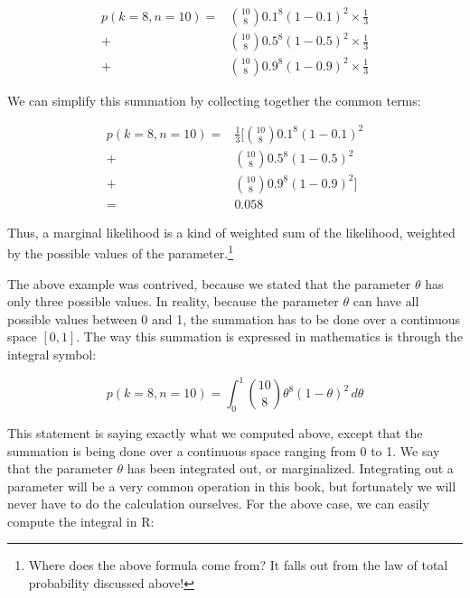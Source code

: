 \documentclass[12pt,]{krantz}
\newenvironment{Shaded}{\begin{snugshade}}{\end{snugshade}}
\newcommand{\ControlFlowTok}[1]{\textcolor[rgb]{0.13,0.29,0.53}{\textbf{#1}}}
\newcommand{\DataTypeTok}[1]{\textcolor[rgb]{0.13,0.29,0.53}{#1}}
\newcommand{\DecValTok}[1]{\textcolor[rgb]{0.00,0.00,0.81}{#1}}
\newcommand{\KeywordTok}[1]{\textcolor[rgb]{0.13,0.29,0.53}{\textbf{#1}}}
\newcommand{\NormalTok}[1]{#1}
\newcommand{\OperatorTok}[1]{\textcolor[rgb]{0.81,0.36,0.00}{\textbf{#1}}}
\newcommand{\StringTok}[1]{\textcolor[rgb]{0.31,0.60,0.02}{#1}}
\theoremstyle{definition}
\theoremstyle{definition}
\theoremstyle{definition}
\theoremstyle{remark}
\begin{document}
\begin{equation}
\begin{split}
p(k=8,n=10) =& \binom{10}{8} 0.1^8 (1-0.1)^{2} \times \frac{1}{3} \\
            +& \binom{10}{8} 0.5^8 (1-0.5)^{2}\times \frac{1}{3} \\
            +& \binom{10}{8} 0.9^8 (1-0.9)^{2}\times \frac{1}{3}
\end{split}
\end{equation}

We can simplify this summation by collecting together the common terms:

\begin{equation}
\begin{split}
p(k=8,n=10) =& \frac{1}{3} [\binom{10}{8}  0.1^8 (1-0.1)^{2} \\
+& \binom{10}{8} 0.5^8 (1-0.5)^{2} \\
+& \binom{10}{8} 0.9^8 (1-0.9)^{2}] \\
=& 0.058 
\end{split}
\end{equation}

Thus, a marginal likelihood is a kind of weighted sum of the likelihood, weighted by the possible values of the parameter.\footnote{Where does the above formula come from? It falls out from the law of total probability discussed above!}

The above example was contrived, because we stated that the parameter \(\theta\) has only three possible values. In reality, because the parameter \(\theta\) can have all possible values between 0 and 1, the summation has to be done over a continuous space \([0,1]\). The way this summation is expressed in mathematics is through the integral symbol:

\begin{equation}
p(k=8,n=10) = \int_0^1 \binom{10}{8} \theta^8 (1-\theta)^{2}\, d\theta
\end{equation}

This statement is saying exactly what we computed above, except that the summation is being done over a continuous space ranging from 0 to 1. We say that the parameter \(\theta\) has been integrated out, or marginalized. Integrating out a parameter will be a very common operation in this book, but fortunately we will never have to do the calculation ourselves. For the above case, we can easily compute the integral in R:

\begin{Shaded}
\end{Shaded}
\end{document}
